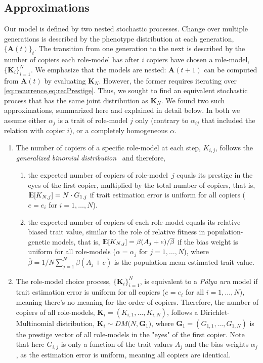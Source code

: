 \documentclass[12pt]{extarticle}
\DeclareMathOperator*{\E}{{\rm I\kern-.3em E}}
\let\vec\mathbf
\begin{document}
\subsection*{Approximations}
Our model is defined by two nested stochastic processes. Change over multiple generations is described by the phenotype distribution at each generation, $\{\vec{A}(t)\}_t$. The transition from one generation to the next is described by the number of copiers each role-model has after $i$ copiers have chosen a role-model, $\{\vec{K}_i\}_{i=1}^N$.
We emphasize that the models are nested: $\vec{A}(t+1)$ can be computed from $\vec{A}(t)$ by evaluating $\vec{K}_{N}$. However, the former requires iterating over \cref{eq:recurrence,eq:recPrestige}. Thus, we sought to find an equivalent stochastic process that has the same joint distribution as $\vec{K}_{N}$. 
We found two such approximations, summarized here and explained in detail below. In both we assume either $\alpha_j$ is a trait of role-model $j$ only (contrary to $\alpha_{ij}$ that included the relation with copier $i$), or a completely homogeneous $\alpha$.
\begin{enumerate}
\item 
The number of copiers of a specific role-model at each step, $K_{i,j}$, follows the {\em generalized binomial distribution}~\citep{GBD} and therefore,
\begin{enumerate}\item the expected number of copiers of role-model~$j$ equals its prestige in the eyes of the first copier, multiplied by the total number of copiers, that is,
$\E[K_{N,j}] = N \cdot G_{1,j}$ if trait estimation error is uniform for all copiers ($e=e_i$ for $i=1, \ldots, N$).
\item the expected number of copiers of each role-model equals its relative biased trait value, similar to the role of relative fitness in population-genetic models, that is, $\E[K_{N,j}] = \beta(A_j+e) / \overline{\beta}$ if the bias weight is uniform for all role-models ($\alpha=\alpha_j$ for $j=1,\ldots,N$), where $\overline{\beta}=1/N \sum_{j=1}^{N}{\beta(A_j+e)}$ is the population mean estimated trait value. 
\end{enumerate}
\item The role-model choice process, $\{\vec{K}_{i}\}_{i=1}^{N}$, is equivalent to a {\em P\'{o}lya urn} model if trait estimation error is uniform for all copiers ($e=e_i$ for all $i=1, \ldots, N$), meaning there's no meaning for the order of copiers. 
Therefore, the number of copiers of all role-models, $\vec{K}_i = (K_{i,1}, \ldots, K_{i,N})$, follows a Dirichlet-Multinomial distribution,
$\vec{K}_i \sim \mathit{DM}\big(N, \vec{G}_1\big)$, where $\vec{G}_1 = (G_{1,1}, \ldots, G_{1,N})$ is the prestige vector of all role-models in the "eyes" of the first copier.
Note that here $G_{i,j}$ is only a function of the trait values $A_j$ and the bias weights $\alpha_j$, as the estimation error is uniform, meaning all copiers are identical.
\end{enumerate}
\end{document}
